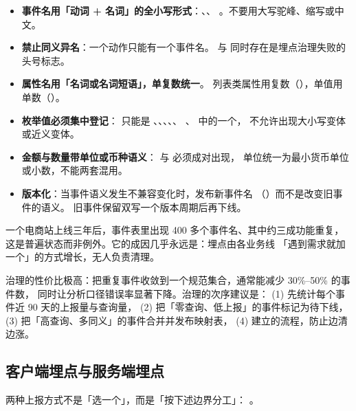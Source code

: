 \begin{itemize}
  \item \textbf{事件名用「动词 + 名词」的全小写形式}：、、
        。不要用大写驼峰、缩写或中文。
  \item \textbf{禁止同义异名}：一个动作只能有一个事件名。
         与  同时存在是埋点治理失败的头号标志。
  \item \textbf{属性名用「名词或名词短语」，单复数统一}。
        列表类属性用复数（），单值用单数（）。
  \item \textbf{枚举值必须集中登记}： 只能是
        、、、、、
        、 中的一个，
        不允许出现大小写变体或近义变体。
  \item \textbf{金额与数量带单位或币种语义}： 与  必须成对出现，
        单位统一为最小货币单位或小数，不能两套混用。
  \item \textbf{版本化}：当事件语义发生不兼容变化时，发布新事件名
        （）而不是改变旧事件的语义。
        旧事件保留双写一个版本周期后再下线。
\end{itemize}

\begin{insight}
一个电商站上线三年后，事件表里出现 400 多个事件名、其中约三成功能重复，
这是普遍状态而非例外。它的成因几乎永远是：埋点由各业务线
「遇到需求就加一个」的方式增长，无人负责清理。

治理的性价比极高：把重复事件收敛到一个规范集合，通常能减少 30\%--50\% 的事件数，
同时让分析口径错误率显著下降。治理的次序建议是：
(1) 先统计每个事件近 90 天的上报量与查询量，
(2) 把「零查询、低上报」的事件标记为待下线，
(3) 把「高查询、多同义」的事件合并并发布映射表，
(4) 建立的流程，防止边清边涨。
\end{insight}

\subsection{客户端埋点与服务端埋点}

两种上报方式不是「选一个」，而是「按下述边界分工」：
。

